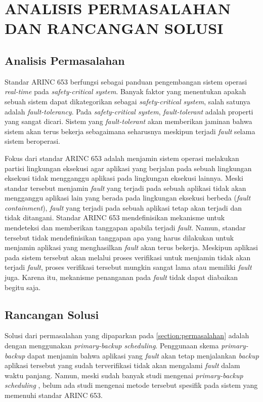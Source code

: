 \chapter{ANALISIS PERMASALAHAN DAN RANCANGAN SOLUSI}

\section{Analisis Permasalahan}
\label{section:permasalahan}

Standar ARINC 653 berfungsi sebagai panduan pengembangan sistem operasi \textit{real-time} pada
\textit{safety-critical system}.  Banyak faktor yang menentukan apakah sebuah sistem dapat
dikategorikan sebagai \textit{safety-critical system}, salah satunya adalah
\textit{fault-tolerancy}.  Pada \textit{safety\hyp critical system}, \textit{fault-tolerant}
adalah properti yang sangat dicari.  Sistem yang \textit{fault-tolerant} akan memberikan jaminan
bahwa sistem akan terus bekerja sebagaimana seharusnya meskipun terjadi \textit{fault} selama
sistem beroperasi.

Fokus dari standar ARINC 653 adalah menjamin sistem operasi melakukan partisi lingkungan
eksekusi agar aplikasi yang berjalan pada sebuah lingkungan eksekusi tidak mengganggu aplikasi
pada lingkungan eksekusi lainnya. Meski standar tersebut menjamin \textit{fault} yang terjadi
pada sebuah aplikasi tidak akan mengganggu aplikasi lain yang berada pada lingkungan eksekusi
berbeda (\textit{fault containment}), \textit{fault} yang terjadi pada sebuah aplikasi tetap
akan terjadi dan tidak ditangani. Standar ARINC 653 mendefinisikan mekanisme untuk mendeteksi
dan memberikan tanggapan apabila terjadi \textit{fault}.  Namun, standar tersebut tidak
mendefinisikan tanggapan apa yang harus dilakukan untuk menjamin aplikasi yang menghasilkan
\textit{fault} akan terus bekerja. Meskipun aplikasi pada sistem tersebut akan melalui proses
verifikasi untuk menjamin tidak akan terjadi \textit{fault}, proses verifikasi tersebut mungkin
sangat lama atau memiliki \textit{fault} juga.  Karena itu, mekanisme penanganan pada \textit{fault}
tidak dapat diabaikan begitu saja.

\section{Rancangan Solusi}
\label{section:solution}

Solusi dari permasalahan yang dipaparkan pada \autoref{section:permasalahan} adalah dengan
menggunakan \textit{primary-backup scheduling}. Penggunaan skema \textit{primary-backup} dapat
menjamin bahwa aplikasi yang \textit{fault} akan tetap menjalankan \textit{backup} aplikasi
tersebut yang sudah terverifikasi tidak akan mengalami \textit{fault} dalam waktu panjang.
Namun, meski sudah banyak studi mengenai \textit{primary-backup scheduling} \citep{Campbell1986}
\citep{Bertossi2006}, belum ada studi mengenai metode tersebut spesifik pada sistem yang
memenuhi standar ARINC 653. 

